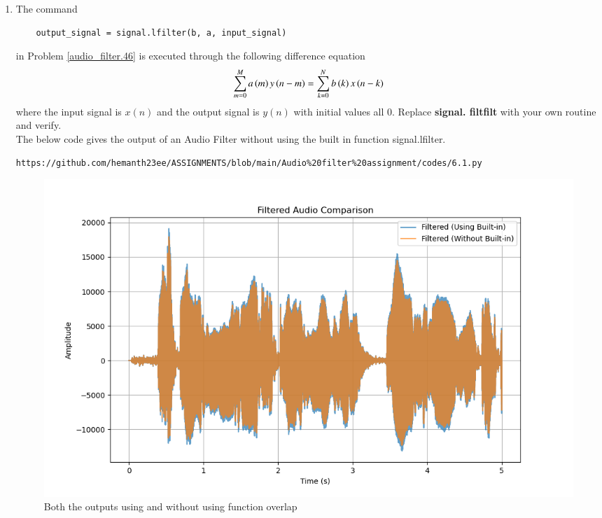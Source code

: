 \documentclass[journal,12pt,twocolumn]{IEEEtran}
\theoremstyle{remark}
\begin{document}
\begin{enumerate}
\item
The command
\begin{lstlisting}
	output_signal = signal.lfilter(b, a, input_signal)
	\end{lstlisting}
in Problem \ref{audio_filter.46} is executed through the following difference equation
\begin{equation}
\label{iir_filter_gen.46}
 \sum _{m=0}^{M}a\left(m\right)y\left(n-m\right)=\sum _{k=0}^{N}b\left(k\right)x\left(n-k\right) 
\end{equation}
%
where the input signal is $x(n)$ and the output signal is $y(n)$ with initial values all 0. Replace
\textbf{signal. filtfilt} with your own routine and verify.\\

\solution The below code gives the output of an Audio Filter without using the built in function signal.lfilter.
\begin{lstlisting}
https://github.com/hemanth23ee/ASSIGNMENTS/blob/main/Audio%20filter%20assignment/codes/6.1.py 
\end{lstlisting}
\begin{figure}[H]
\centering
\includegraphics[width=1.2\columnwidth]{figs/Audio_Filter_verf.png}
\caption{Both the outputs using and without using function overlap}
\label{6.1.46}
\end{figure}






\end{enumerate}
\end{document}
